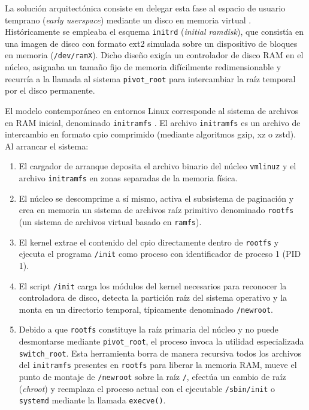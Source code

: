 \documentclass[12pt]{article}
\begin{document}
La solución arquitectónica consiste en delegar esta fase al espacio de usuario temprano (\textit{early userspace}) mediante un disco en memoria virtual \parencite{kernel2024initramfs}. Históricamente se empleaba el esquema \texttt{initrd} (\textit{initial ramdisk}), que consistía en una imagen de disco con formato ext2 simulada sobre un dispositivo de bloques en memoria (\texttt{/dev/ramX}). Dicho diseño exigía un controlador de disco RAM en el núcleo, asignaba un tamaño fijo de memoria difícilmente redimensionable y recurría a la llamada al sistema \texttt{pivot\_root} para intercambiar la raíz temporal por el disco permanente.

El modelo contemporáneo en entornos Linux corresponde al sistema de archivos en RAM inicial, denominado \texttt{initramfs} \parencite{kernel2024initramfs}. El archivo \texttt{initramfs} es un archivo de intercambio en formato cpio comprimido (mediante algoritmos gzip, xz o zstd). Al arrancar el sistema:
\begin{enumerate}[noitemsep, topsep=2pt]
    \item El cargador de arranque deposita el archivo binario del núcleo \texttt{vmlinuz} y el archivo \texttt{initramfs} en zonas separadas de la memoria física.
    \item El núcleo se descomprime a sí mismo, activa el subsistema de paginación y crea en memoria un sistema de archivos raíz primitivo denominado \texttt{rootfs} (un sistema de archivos virtual basado en \texttt{ramfs}).
    \item El kernel extrae el contenido del cpio directamente dentro de \texttt{rootfs} y ejecuta el programa \texttt{/init} como proceso con identificador de proceso 1 (PID 1).
    \item El script \texttt{/init} carga los módulos del kernel necesarios para reconocer la controladora de disco, detecta la partición raíz del sistema operativo y la monta en un directorio temporal, típicamente denominado \texttt{/newroot}.
    \item Debido a que \texttt{rootfs} constituye la raíz primaria del núcleo y no puede desmontarse mediante \texttt{pivot\_root}, el proceso invoca la utilidad especializada \texttt{switch\_root}. Esta herramienta borra de manera recursiva todos los archivos del \texttt{initramfs} presentes en \texttt{rootfs} para liberar la memoria RAM, mueve el punto de montaje de \texttt{/newroot} sobre la raíz \texttt{/}, efectúa un cambio de raíz (\textit{chroot}) y reemplaza el proceso actual con el ejecutable \texttt{/sbin/init} o \texttt{systemd} mediante la llamada \texttt{execve()}.
\end{enumerate}
\end{document}
